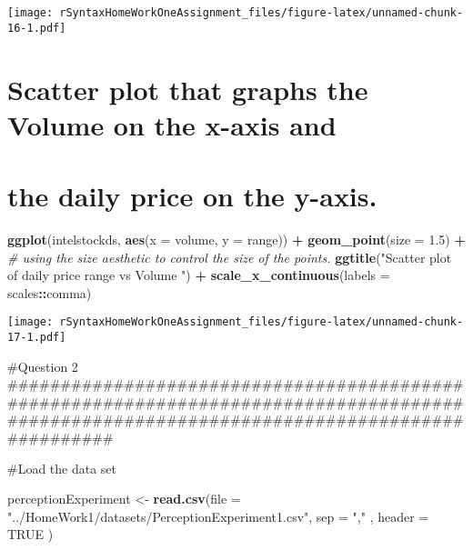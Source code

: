 \documentclass[
]{article}
\newenvironment{Shaded}{\begin{snugshade}}{\end{snugshade}}
\newcommand{\CommentTok}[1]{\textcolor[rgb]{0.56,0.35,0.01}{\textit{#1}}}
\newcommand{\DataTypeTok}[1]{\textcolor[rgb]{0.13,0.29,0.53}{#1}}
\newcommand{\FloatTok}[1]{\textcolor[rgb]{0.00,0.00,0.81}{#1}}
\newcommand{\KeywordTok}[1]{\textcolor[rgb]{0.13,0.29,0.53}{\textbf{#1}}}
\newcommand{\NormalTok}[1]{#1}
\newcommand{\OperatorTok}[1]{\textcolor[rgb]{0.81,0.36,0.00}{\textbf{#1}}}
\newcommand{\OtherTok}[1]{\textcolor[rgb]{0.56,0.35,0.01}{#1}}
\newcommand{\StringTok}[1]{\textcolor[rgb]{0.31,0.60,0.02}{#1}}
\begin{document}
\texttt{[image: rSyntaxHomeWorkOneAssignment\_files/figure-latex/unnamed-chunk-16-1.pdf]}

\hypertarget{scatter-plot-that-graphs-the-volume-on-the-x-axis-and}{%
\section{Scatter plot that graphs the Volume on the x-axis
and}\label{scatter-plot-that-graphs-the-volume-on-the-x-axis-and}}

\hypertarget{the-daily-price-on-the-y-axis.}{%
\section{the daily price on the
y-axis.}\label{the-daily-price-on-the-y-axis.}}

\begin{Shaded}
\begin{Highlighting}[]
\KeywordTok{ggplot}\NormalTok{(intelstockds, }\KeywordTok{aes}\NormalTok{(}\DataTypeTok{x =}\NormalTok{ volume, }\DataTypeTok{y =}\NormalTok{ range)) }\OperatorTok{+}\StringTok{ }
\StringTok{  }\KeywordTok{geom_point}\NormalTok{(}\DataTypeTok{size =} \FloatTok{1.5}\NormalTok{) }\OperatorTok{+}\StringTok{ }\CommentTok{# using the size aesthetic to control the size of the points.}
\StringTok{  }\KeywordTok{ggtitle}\NormalTok{(}\StringTok{"Scatter plot of daily price range vs Volume "}\NormalTok{) }\OperatorTok{+}\StringTok{ }
\StringTok{  }\KeywordTok{scale_x_continuous}\NormalTok{(}\DataTypeTok{labels =}\NormalTok{ scales}\OperatorTok{::}\NormalTok{comma) }
\end{Highlighting}
\end{Shaded}

\texttt{[image: rSyntaxHomeWorkOneAssignment\_files/figure-latex/unnamed-chunk-17-1.pdf]}

\#Question 2
\#\#\#\#\#\#\#\#\#\#\#\#\#\#\#\#\#\#\#\#\#\#\#\#\#\#\#\#\#\#\#\#\#\#\#\#\#\#\#\#\#\#\#\#\#\#\#\#\#\#\#\#\#\#\#\#\#\#\#\#\#\#\#\#\#\#\#\#\#\#\#\#\#\#\#\#\#\#\#\#\#\#\#\#\#\#\#\#\#\#\#\#\#\#\#\#\#\#\#\#\#\#\#\#\#\#\#\#\#\#\#\#\#\#\#\#\#\#\#\#\#\#\#\#\#\#\#\#\#\#\#\#\#\#\#\#\#\#\#

\#Load the data set

\begin{Shaded}
\begin{Highlighting}[]
\NormalTok{perceptionExperiment <-}\StringTok{ }\KeywordTok{read.csv}\NormalTok{(}\DataTypeTok{file =} \StringTok{"../HomeWork1/datasets/PerceptionExperiment1.csv"}\NormalTok{, }\DataTypeTok{sep =} \StringTok{","}\NormalTok{ , }\DataTypeTok{header =} \OtherTok{TRUE}\NormalTok{ )}
\end{Highlighting}
\end{Shaded}
\end{document}
